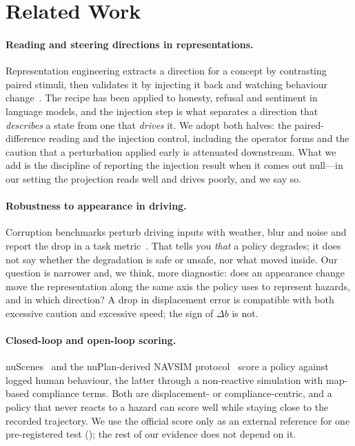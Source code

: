 \section{Related Work}
\label{sec:related}

\paragraph{Reading and steering directions in representations.}
Representation engineering extracts a direction for a concept by contrasting paired
stimuli, then validates it by injecting it back and watching behaviour
change~\cite{zou2023repe}. The recipe has been applied to honesty, refusal and
sentiment in language models, and the injection step is what separates a direction
that \emph{describes} a state from one that \emph{drives} it. We adopt both halves:
the paired-difference reading and the injection control, including the operator forms
and the caution that a perturbation applied early is attenuated downstream. What we
add is the discipline of reporting the injection result when it comes out null---in
our setting the projection reads well and drives poorly, and we say so.

\paragraph{Robustness to appearance in driving.}
Corruption benchmarks perturb driving inputs with weather, blur and noise and report
the drop in a task metric~\cite{kong2023robodepth}. That tells you \emph{that} a policy
degrades; it does not say whether the degradation is safe or unsafe, nor what moved
inside. Our question is narrower and, we think, more diagnostic: does an appearance
change move the representation along the same axis the policy uses to represent
hazards, and in which direction? A drop in displacement error is compatible with both
excessive caution and excessive speed; the sign of $\Delta b$ is not.

\paragraph{Closed-loop and open-loop scoring.}
nuScenes~\cite{caesar2020nuscenes} and the nuPlan-derived NAVSIM
protocol~\cite{dauner2024navsim} score a policy against logged human behaviour, the
latter through a non-reactive simulation with map-based compliance terms. Both are
displacement- or compliance-centric, and a policy that never reacts to a hazard can
score well while staying close to the recorded trajectory. We use the official score
only as an external reference for one pre-registered test (); the
rest of our evidence does not depend on it.

